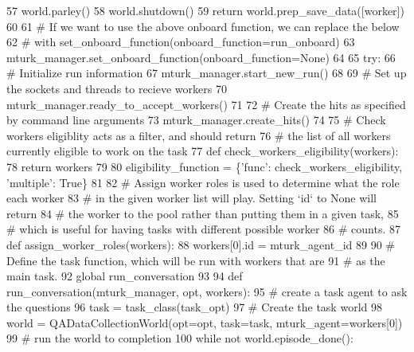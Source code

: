 \begin{DoxyCode}
57             world.parley()
58         world.shutdown()
59         \textcolor{keywordflow}{return} world.prep\_save\_data([worker])
60 
61     \textcolor{comment}{# If we want to use the above onboard function, we can replace the below}
62     \textcolor{comment}{# with set\_onboard\_function(onboard\_function=run\_onboard)}
63     mturk\_manager.set\_onboard\_function(onboard\_function=\textcolor{keywordtype}{None})
64 
65     \textcolor{keywordflow}{try}:
66         \textcolor{comment}{# Initialize run information}
67         mturk\_manager.start\_new\_run()
68 
69         \textcolor{comment}{# Set up the sockets and threads to recieve workers}
70         mturk\_manager.ready\_to\_accept\_workers()
71 
72         \textcolor{comment}{# Create the hits as specified by command line arguments}
73         mturk\_manager.create\_hits()
74 
75         \textcolor{comment}{# Check workers eligiblity acts as a filter, and should return}
76         \textcolor{comment}{# the list of all workers currently eligible to work on the task}
77         \textcolor{keyword}{def }check\_workers\_eligibility(workers):
78             \textcolor{keywordflow}{return} workers
79 
80         eligibility\_function = \{\textcolor{stringliteral}{'func'}: check\_workers\_eligibility, \textcolor{stringliteral}{'multiple'}: \textcolor{keyword}{True}\}
81 
82         \textcolor{comment}{# Assign worker roles is used to determine what the role each worker}
83         \textcolor{comment}{# in the given worker list will play. Setting `id` to None will return}
84         \textcolor{comment}{# the worker to the pool rather than putting them in a given task,}
85         \textcolor{comment}{# which is useful for having tasks with different possible worker}
86         \textcolor{comment}{# counts.}
87         \textcolor{keyword}{def }assign\_worker\_roles(workers):
88             workers[0].id = mturk\_agent\_id
89 
90         \textcolor{comment}{# Define the task function, which will be run with workers that are}
91         \textcolor{comment}{# as the main task.}
92         \textcolor{keyword}{global} run\_conversation
93 
94         \textcolor{keyword}{def }run\_conversation(mturk\_manager, opt, workers):
95             \textcolor{comment}{# create a task agent to ask the questions}
96             task = task\_class(task\_opt)
97             \textcolor{comment}{# Create the task world}
98             world = QADataCollectionWorld(opt=opt, task=task, mturk\_agent=workers[0])
99             \textcolor{comment}{# run the world to completion}
100             \textcolor{keywordflow}{while} \textcolor{keywordflow}{not} world.episode\_done():

\end{DoxyCode}
